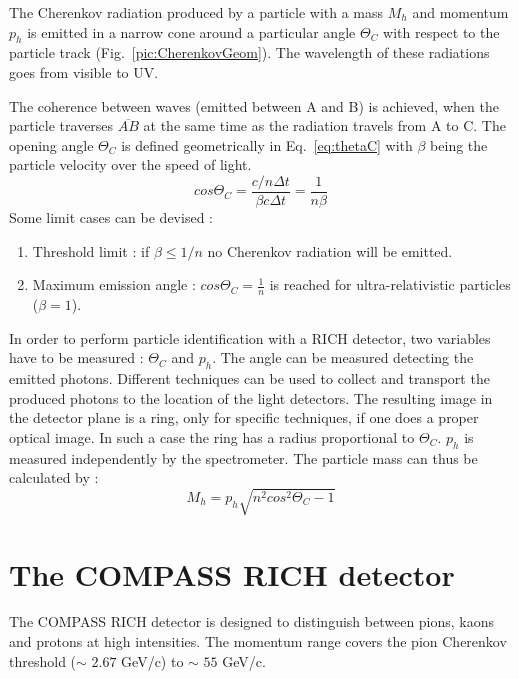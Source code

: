 The Cherenkov radiation produced by a particle with a mass $M_h$ and momentum $p_h$ is emitted in a narrow cone around a particular angle $\Theta_C$ with respect to the particle track (Fig.~\ref{pic:CherenkovGeom}). The wavelength of these radiations goes from visible to UV.

The coherence between waves (emitted between A and B) is achieved, when the particle traverses $\overline{AB}$ at the same time as the radiation travels from A to C. The opening angle $\Theta_C$ is defined geometrically in Eq.~\ref{eq:thetaC} with $\beta$ being the particle velocity over the speed of light.
%
\begin{equation}
  cos\Theta_C = \frac{c/n \Delta t}{\beta c \Delta t} = \frac{1}{n\beta}
  \label{eq:thetaC}
\end{equation}
%
Some limit cases can be devised :
\begin{enumerate}
  \item Threshold limit : if $\beta \leq 1/n$ no Cherenkov radiation will be emitted.
  \item Maximum emission angle : $cos \Theta_C = \frac{1}{n}$ is reached for ultra-relativistic particles ($\beta = 1$).
\end{enumerate}

In order to perform particle identification with a RICH detector, two variables have to be measured : $\Theta_C$ and $p_h$. The angle can be measured detecting the emitted photons. Different techniques can be used to collect and transport the produced photons to the location of the light detectors. The resulting image in the detector plane is a ring, only for specific techniques, if one does a proper optical image. In such a case the ring has a radius proportional to $\Theta_C$. $p_h$ is measured independently by the spectrometer. The particle mass can thus be calculated by :
%
\begin{equation}
  M_h = p_h \sqrt{n^2 cos^2 \Theta_C -1}
\end{equation}


\section{The COMPASS RICH detector}

The COMPASS RICH detector is designed to distinguish between pions, kaons and protons at high intensities. The momentum range covers the pion Cherenkov threshold ($\sim$ $2.67$ GeV/c) to $\sim$ $55$ GeV/c.

